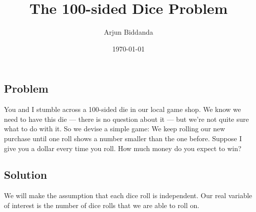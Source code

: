 \documentclass[12pt]{article}
\title{The 100-sided Dice Problem}
\author{Arjun Biddanda}
\date{\today}
\begin{document}
\maketitle
\linenumbers

\subsection*{Problem}

You and I stumble across a 100-sided die in our local game shop. We know we need to have this die — there is no question about it — but we’re not quite sure what to do with it. So we devise a simple game: We keep rolling our new purchase until one roll shows a number smaller than the one before. Suppose I give you a dollar every time you roll. How much money do you expect to win?

\subsection*{Solution}

We will make the assumption that each dice roll is independent. Our real variable of interest is the number of dice rolls that we are able to roll on. 
\end{document}
